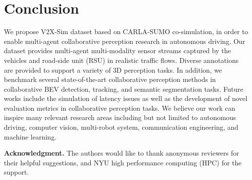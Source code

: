 \section{Conclusion}\label{sec:conclusion}
We propose V2X-Sim dataset based on CARLA-SUMO co-simulation, in order to enable multi-agent collaborative perception research in autonomous driving. Our dataset provides multi-agent multi-modality sensor streams captured by the vehicles and road-side unit (RSU) in realistic traffic flows. Diverse annotations are provided to support a variety of 3D perception tasks. In addition, we benchmark several state-of-the-art collaborative perception methods in collaborative BEV detection, tracking, and semantic segmentation tasks. Future works include the simulation of latency issues as well as the development of novel evaluation metrics in collaborative perception tasks. We believe our work can inspire many relevant research areas including but not limited to autonomous driving, computer vision, multi-robot system, communication engineering, and machine learning. 

\textbf{Acknowledgment.} The authors would like to thank anonymous reviewers for their helpful suggestions, and NYU high performance computing (HPC) for the support.

\normalem

